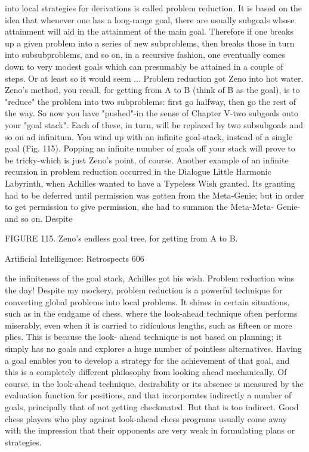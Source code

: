{into local strategies for derivations is called problem reduction. It is based on the idea that
whenever one has a long-range goal, there are usually subgoals whose attainment will aid
in the attainment of the main goal. Therefore if one breaks up a given problem into a
series of new subproblems, then breaks those in turn into subsubproblems, and so on, in a
recursive fashion, one eventually comes down to very modest goals which can
presumably be attained in a couple of steps. Or at least so it would seem ...
      Problem reduction got Zeno into hot water. Zeno's method, you recall, for getting
from A to B (think of B as the goal), is to "reduce" the problem into two subproblems:
first go halfway, then go the rest of the way. So now you have "pushed"-in the sense of
Chapter V-two subgoals onto your "goal stack". Each of these, in turn, will be replaced
by two subsubgoals and so on ad infinitum. You wind up with an infinite goal-stack,
instead of a single goal (Fig. 115). Popping an infinite number of goals off your stack will
prove to be tricky-which is just Zeno's point, of course.
      Another example of an infinite recursion in problem reduction occurred in the
Dialogue Little Harmonic Labyrinth, when Achilles wanted to have a Typeless Wish
granted. Its granting had to be deferred until permission was gotten from the Meta-Genie;
but in order to get permission to give permission, she had to summon the Meta-Meta-
Genie-and so on. Despite

              FIGURE 115. Zeno's endless goal tree, for getting from A to B.




Artificial Intelligence: Retrospects                                                       606

the infiniteness of the goal stack, Achilles got his wish. Problem reduction wins the day!
      Despite my mockery, problem reduction is a powerful technique for converting
global problems into local problems. It shines in certain situations, such as in the
endgame of chess, where the look-ahead technique often performs miserably, even when
it is carried to ridiculous lengths, such as fifteen or more plies. This is because the look-
ahead technique is not based on planning; it simply has no goals and explores a huge
number of pointless alternatives. Having a goal enables you to develop a strategy for the
achievement of that goal, and this is a completely different philosophy from looking
ahead mechanically. Of course, in the look-ahead technique, desirability or its absence is
measured by the evaluation function for positions, and that incorporates indirectly a
number of goals, principally that of not getting checkmated. But that is too indirect. Good
chess players who play against look-ahead chess programs usually come away with the
impression that their opponents are very weak in formulating plans or strategies.

}
